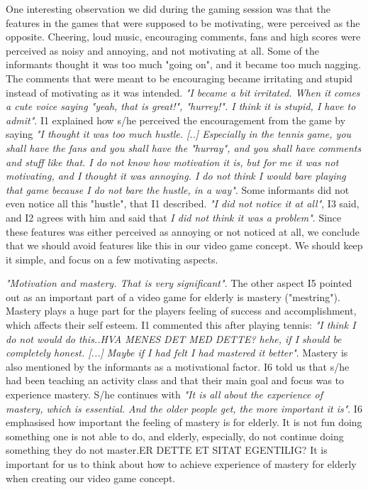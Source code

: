 One interesting observation we did during the gaming session was that the features in the games that were supposed to be motivating, were perceived as the opposite. Cheering, loud music, encouraging comments, fans and high scores were perceived as noisy and annoying, and not motivating at all. Some of the informants thought it was too much "going on", and it became too much nagging. The comments that were meant to be encouraging became irritating and stupid instead of motivating as it was intended. \emph{"I became a bit irritated. When it comes a cute voice saying "yeah, that is great!", "hurrey!". I think it is stupid, I have to admit"}.  I1 explained how s/he perceived the encouragement from the game by saying \emph{"I thought it was too much hustle. [..] Especially in the tennis game, you shall have the fans and you shall have the "hurray", and you shall have comments and stuff like that. I do not know how motivation it is, but for me it was not motivating, and I thought it was annoying. I do not think I would bare playing that game because I do not bare the hustle, in a way"}. Some informants did not even notice all this "hustle", that I1 described. \emph{"I did not notice it at all"}, I3 said, and I2 agrees with him and said that \emph{I did not think it was a problem"}. Since these features was either perceived as annoying or not noticed at all, we conclude that we should avoid features like this in our video game concept. We should keep it simple, and focus on a few motivating aspects. 

\emph{"Motivation and mastery. That is very significant"}. The other aspect I5 pointed out as an important part of a video game for elderly is mastery ("mestring"). Mastery plays a huge part for the players feeling of success and accomplishment, which affects their self esteem. I1 commented this after playing tennis: \emph{"I think I do not would do this..HVA MENES DET MED DETTE? hehe, if I should be completely honest. [...] Maybe if I had felt I had mastered it better"}. Mastery is also mentioned by the informants as a motivational factor. I6 told us that s/he had been teaching an activity class and that their main goal and focus was to experience mastery. S/he continues with \emph{"It is all about the experience of mastery, which is essential. And the older people get, the more important it is"}. I6 emphasised how important the feeling of mastery is for elderly. It is not fun doing something one is not able to do, and elderly, especially, do not continue doing something they do not master.ER DETTE ET SITAT EGENTILIG? It is important for us to think about how to achieve experience of mastery for elderly when creating our video game concept. 

